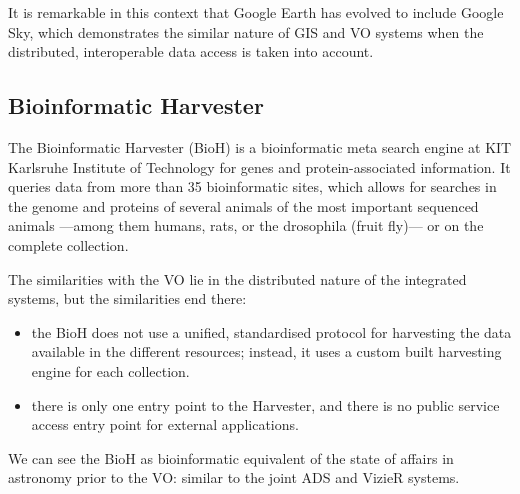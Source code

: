 		 It is remarkable in this context that Google Earth has
		evolved to include Google Sky, which demonstrates the
		similar nature of GIS and VO systems when the distributed,
		interoperable data access is taken into account.
	
		
	\subsection{Bioinformatic Harvester} %
	\label{sub:genbank}
	
		The Bioinformatic
		Harvester
		(BioH) is a bioinformatic meta search engine at KIT
		Karlsruhe Institute of Technology for genes and
		protein-associated information. It queries data from more
		than 35 bioinformatic sites, which allows for searches in
		the genome and proteins of several animals of the most
		important sequenced animals ---among them humans, rats, or
		the drosophila (fruit fly)--- or on the complete
		collection.
		
		 The similarities with the VO lie in the distributed nature
		of the integrated systems, but the similarities end there:
		
		\begin{itemize}
			\item the BioH does not use a unified, standardised
			protocol for harvesting the data available in the
			different resources; instead, it uses a custom built
			harvesting engine for each collection.
			
			 \item there is only one entry point to the Harvester,
			and there is no public service access entry point for
			external applications.
		\end{itemize}
		
		 We can see the BioH as bioinformatic equivalent of the
		state of affairs in astronomy prior to the VO: similar to
		the joint ADS and VizieR systems.
	
	
